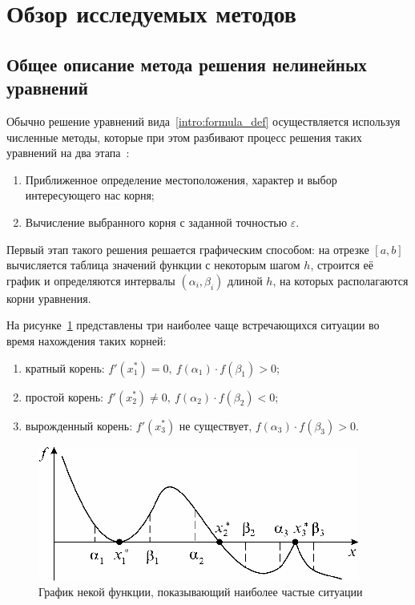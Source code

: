 \section{Обзор исследуемых методов}
\label{sec:theory}

\subsection{Общее описание метода решения нелинейных уравнений}
Обычно решение уравнений вида~\ref{intro:formula_def} осуществляется используя численные методы, которые при этом разбивают процесс решения таких уравнений на два этапа~\cite[стр. 48]{vich_mat}:
\begin{enumerate}
	\item Приближенное определение местоположения, характер и выбор интересующего нас корня;
	\item \label{theory:steps_second} Вычисление выбранного корня с заданной точностью $\varepsilon$.
\end{enumerate}

Первый этап такого решения решается графическим способом: на отрезке $[a,b]$ вычисляется таблица значений функции с некоторым шагом $h$, строится её график и определяются интервалы $(\alpha_i, \beta_i)$ длиной $h$, на которых располагаются корни уравнения. 

На рисунке~\ref{fig:theory:graph} представлены три наиболее чаще встречающихся ситуации во время нахождения таких корней:
\begin{enumerate}
	\item кратный корень: $f'(x_1^*)=0,\ f(\alpha_1)\cdot f(\beta_1) > 0$;
	\item простой корень: $f'(x_2^*)\neq 0,\ f(\alpha_2)\cdot f(\beta_2)<0$;
	\item вырожденный корень: $f'(x_3^*)$ не существует, $f(\alpha_3)\cdot f(\beta_3)>0$.
\end{enumerate}
\begin{figure}[ht]
	\centering
	\includegraphics{attachments/theory_graph}
	\caption{ График некой функции, показывающий наиболее частые ситуации}
	\label{fig:theory:graph}
\end{figure}

